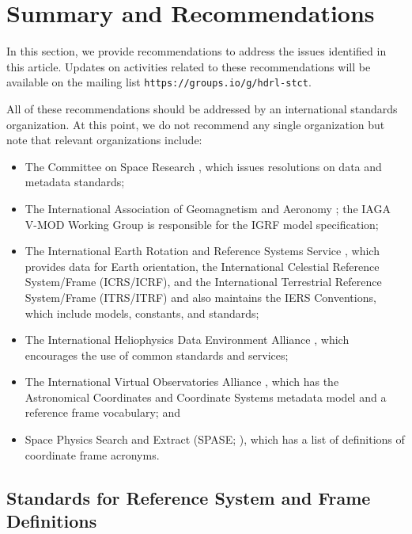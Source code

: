 \documentclass[draft]{agujournal2019}
\begin{document}
\section{Summary and Recommendations}
\label{sect:conclusions}

In this section, we provide recommendations to address the issues identified in this article. Updates on activities related to these recommendations will be available on the mailing list \texttt{https://groups.io/g/hdrl-stct}.

All of these recommendations should be addressed by an international standards organization. At this point, we do not recommend any single organization but note that relevant organizations include:

\begin{itemize}

    \item The Committee on Space Research \cite{COSPAR}, which issues resolutions on data and metadata standards;

    \item The International Association of Geomagnetism and Aeronomy \cite{IAGA2026}; the IAGA V-MOD Working Group \cite{IAGA_V-MOD2026} is responsible for the IGRF model specification;

    \item The International Earth Rotation and Reference Systems Service \cite{IERS}, which provides data for Earth orientation, the International Celestial Reference System/Frame (ICRS/ICRF), and the International Terrestrial Reference System/Frame (ITRS/ITRF) and also maintains the IERS Conventions, which include models, constants, and standards;

    \item The International Heliophysics Data Environment Alliance \cite{IHDEA}, which encourages the use of common standards and services;

    \item The International Virtual Observatories Alliance \cite{IVOA}, which has the Astronomical Coordinates and Coordinate Systems metadata model and a reference frame vocabulary; and

    \item Space Physics Search and Extract (SPASE;  ), which has a list of definitions of coordinate frame acronyms.
\end{itemize}

\subsection{Standards for Reference System and Frame Definitions}
\label{sect:standard-for}
\end{document}
